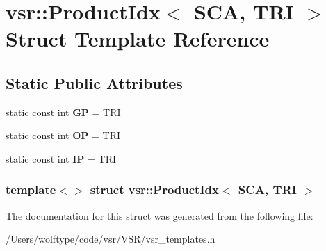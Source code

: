 \hypertarget{structvsr_1_1_product_idx_3_01_s_c_a_00_01_t_r_i_01_4}{\section{vsr\-:\-:Product\-Idx$<$ S\-C\-A, T\-R\-I $>$ Struct Template Reference}
\label{structvsr_1_1_product_idx_3_01_s_c_a_00_01_t_r_i_01_4}
}
\subsection*{Static Public Attributes}
\begin{DoxyCompactItemize}
\item 
\hypertarget{structvsr_1_1_product_idx_3_01_s_c_a_00_01_t_r_i_01_4_a7081503e1c686a8a46f1acd9f286d850}{static const int {\bfseries G\-P} = T\-R\-I}\label{structvsr_1_1_product_idx_3_01_s_c_a_00_01_t_r_i_01_4_a7081503e1c686a8a46f1acd9f286d850}

\item 
\hypertarget{structvsr_1_1_product_idx_3_01_s_c_a_00_01_t_r_i_01_4_a5f3816d079f8dfd7251b2f603e626e6d}{static const int {\bfseries O\-P} = T\-R\-I}\label{structvsr_1_1_product_idx_3_01_s_c_a_00_01_t_r_i_01_4_a5f3816d079f8dfd7251b2f603e626e6d}

\item 
\hypertarget{structvsr_1_1_product_idx_3_01_s_c_a_00_01_t_r_i_01_4_af121659f0e35f5203203f8e60b63da49}{static const int {\bfseries I\-P} = T\-R\-I}\label{structvsr_1_1_product_idx_3_01_s_c_a_00_01_t_r_i_01_4_af121659f0e35f5203203f8e60b63da49}

\end{DoxyCompactItemize}
\subsubsection*{template$<$$>$ struct vsr\-::\-Product\-Idx$<$ S\-C\-A, T\-R\-I $>$}



The documentation for this struct was generated from the following file\-:\begin{DoxyCompactItemize}
\item 
/\-Users/wolftype/code/vsr/\-V\-S\-R/vsr\-\_\-templates.\-h\end{DoxyCompactItemize}
